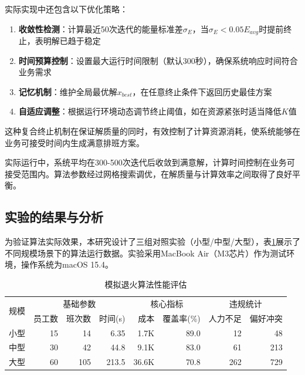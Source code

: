\documentclass{ctexart}
\begin{document}
实际实现中还包含以下优化策略：
\begin{enumerate}
    \item \textbf{收敛性检测}：计算最近50次迭代的能量标准差$\sigma_E$，当$\sigma_E < 0.05E_{avg}$时提前终止，表明解已趋于稳定
    \item \textbf{时间预算控制}：设置最大运行时间限制（默认300秒），确保系统响应时间符合业务需求
    \item \textbf{记忆机制}：维护全局最优解$x_{best}$，在任意终止条件下返回历史最佳方案
    \item \textbf{自适应调整}：根据运行环境动态调节终止阈值，如在资源紧张时适当降低$K$值
\end{enumerate}

这种复合终止机制在保证解质量的同时，有效控制了计算资源消耗，使系统能够在业务可接受时间内生成满意排班方案。

实际运行中，系统平均在300-500次迭代后收敛到满意解，计算时间控制在业务可接受范围内。算法参数经过网格搜索调优，在解质量与计算效率之间取得了良好平衡。

\subsection{实验的结果与分析}
为验证算法实际效果，本研究设计了三组对照实验（小型/中型/大型），表\ref{tab:exp-results}展示了不同规模场景下的算法运行数据。实验采用MacBook Air（M3芯片）作为测试环境，操作系统为macOS 15.4。

\begin{table}[H]
    \centering
    \small  %
    \caption{模拟退火算法性能评估}
    \label{tab:exp-results}
    \begin{tabular}{@{}lrrrrrrr@{}}
    \toprule
    \multirow{2}{*}{规模} & \multicolumn{3}{c}{基础参数} & \multicolumn{2}{c}{核心指标} & \multicolumn{2}{c}{违规统计} \\
    \cmidrule(lr){2-4} \cmidrule(lr){5-6} \cmidrule(lr){7-8}
    & 员工数 & 班次数 & 时间(s) & 成本 & 覆盖率(\%) & 人力不足 & 偏好冲突 \\
    \midrule
    小型 & 15 & 14 & 6.35 & 1.7K & 89.0 & 12 & 48 \\
    中型 & 30 & 42 & 44.8 & 9.1K & 83.0 & 61 & 213 \\
    大型 & 60 & 105 & 213.5 & 36.6K & 70.8 & 262 & 729 \\
    \bottomrule
    \end{tabular}
    \vspace{0.5em}
\end{table}
\end{document}
